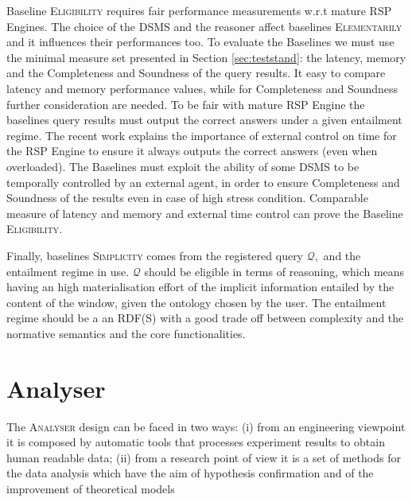 Baseline \textsc{Eligibility} requires fair performance measurements w.r.t mature RSP Engines. The choice of the DSMS and the reasoner affect baselines \textsc{Elementarily} and it influences their performances too. To evaluate the Baselines we must use the minimal measure set presented in Section \ref{sec:teststand}: the latency, memory and the Completeness and Soundness of the query results. It easy to compare latency and memory performance values, while for Completeness and Soundness further consideration are needed. To be fair with mature RSP Engine the baselines query results must output the correct answers under a given entailment regime. The recent work \cite{DBLP:conf/semweb/DellAglioCBCV13} explains the importance of external control on time for the RSP Engine to ensure it always outputs the correct answers (even when overloaded). The Baselines must exploit the ability of some DSMS to be temporally controlled by an external agent, in order to ensure Completeness and Soundness of the results even in case of high stress condition. Comparable measure of latency and memory and external time control can  prove the Baseline \textsc{Eligibility}.

Finally, baselines \textsc{Simplicity} comes from the registered query $\mathcal{Q},$ and the entailment regime in use. $\mathcal{Q}$ should be eligible in terms of reasoning, which means having an high materialisation effort of the implicit information entailed by the content of the window, given the ontology chosen by the user. The entailment regime should be a an RDF(S) with a good trade off between complexity and the normative semantics and the core functionalities. %

\section{Analyser}\label{sec:analyser}

The \textsc{Analyser} design can be faced in two ways: (i) from an engineering viewpoint it is composed by automatic tools that processes experiment results to obtain human readable data; (ii) from a research point of view it is a set of methods for the data analysis which have the aim of hypothesis confirmation and of the improvement of theoretical models 


